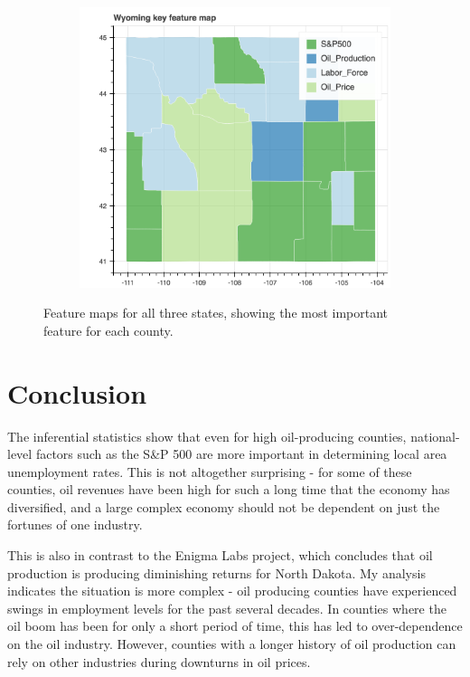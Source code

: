 \documentclass[11pt,letterpaper]{article}
\begin{document}
\begin{figure}[h!]
\begin{subfigure}{0.4\textwidth}
\includegraphics[width=\linewidth]{wy_feature}
\end{subfigure}
\caption{Feature maps for all three states, showing the most important feature for each county.}
\label{fig:feature_maps}
\end{figure}

\section{Conclusion}
The inferential statistics show that even for high oil-producing counties, national-level factors such as the S\&P 500 are more important in determining local area unemployment rates. This is not altogether surprising - for some of these counties, oil revenues have been high for such a long time that the economy has diversified, and a large complex economy should not be dependent on just the fortunes of one industry. 

This is also in contrast to the Enigma Labs project, which concludes that oil production is producing diminishing returns for North Dakota. My analysis indicates the situation is more complex - oil producing counties have experienced swings in employment levels for the past several decades. In counties where the oil boom has been for only a short period of time, this has led to over-dependence on the oil industry. However, counties with a longer history of oil production can rely on other industries during downturns in oil prices.
\end{document}
